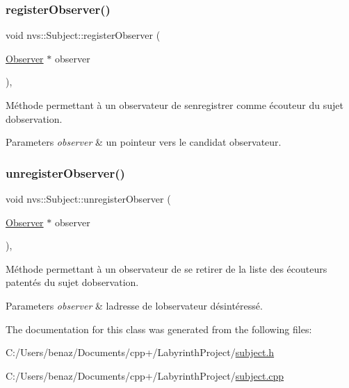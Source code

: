 \subsubsection{\texorpdfstring{register\+Observer()}{registerObserver()}}
{\footnotesize\ttfamily void nvs\+::\+Subject\+::register\+Observer (\begin{DoxyParamCaption}\item[{\mbox{\hyperlink{classnvs_1_1_observer}{Observer}} $\ast$}]{observer }\end{DoxyParamCaption})\hspace{0.3cm}{\ttfamily [final]}, {\ttfamily [virtual]}}



Méthode permettant à un observateur de s\textquotesingle{}enregistrer comme écouteur du sujet d\textquotesingle{}observation. 


\begin{DoxyParams}{Parameters}
{\em observer} & un pointeur vers le candidat observateur. \\
\hline
\end{DoxyParams}
\mbox{\label{classnvs_1_1_subject_a749bc5b9a58ba0f72abbbce0f01f8a24}} 
\subsubsection{\texorpdfstring{unregister\+Observer()}{unregisterObserver()}}
{\footnotesize\ttfamily void nvs\+::\+Subject\+::unregister\+Observer (\begin{DoxyParamCaption}\item[{\mbox{\hyperlink{classnvs_1_1_observer}{Observer}} $\ast$}]{observer }\end{DoxyParamCaption})\hspace{0.3cm}{\ttfamily [final]}, {\ttfamily [virtual]}}



Méthode permettant à un observateur de se retirer de la liste des écouteurs patentés du sujet d\textquotesingle{}observation. 


\begin{DoxyParams}{Parameters}
{\em observer} & l\textquotesingle{}adresse de l\textquotesingle{}observateur désintéressé. \\
\hline
\end{DoxyParams}


The documentation for this class was generated from the following files\+:\begin{DoxyCompactItemize}
\item 
C\+:/\+Users/benaz/\+Documents/cpp+/\+Labyrinth\+Project/\mbox{\hyperlink{subject_8h}{subject.\+h}}\item 
C\+:/\+Users/benaz/\+Documents/cpp+/\+Labyrinth\+Project/\mbox{\hyperlink{subject_8cpp}{subject.\+cpp}}\end{DoxyCompactItemize}
